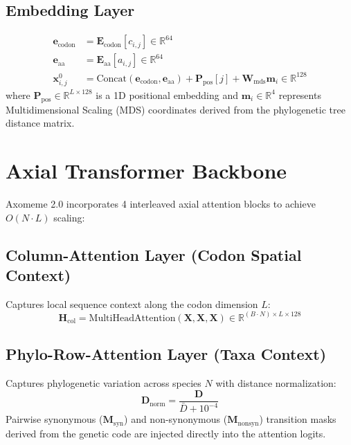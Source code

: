 \documentclass[11pt,a4paper]{article}
\begin{document}
\subsection{Embedding Layer}
\begin{align}
\mathbf{e}_{\text{codon}} &= \mathbf{E}_{\text{codon}}[c_{i,j}] \in \mathbb{R}^{64} \\
\mathbf{e}_{\text{aa}} &= \mathbf{E}_{\text{aa}}[a_{i,j}] \in \mathbb{R}^{64} \\
\mathbf{x}_{i,j}^0 &= \text{Concat}(\mathbf{e}_{\text{codon}}, \mathbf{e}_{\text{aa}}) + \mathbf{P}_{\text{pos}}[j] + \mathbf{W}_{\text{mds}} \mathbf{m}_i \in \mathbb{R}^{128}
\end{align}
where $\mathbf{P}_{\text{pos}} \in \mathbb{R}^{L \times 128}$ is a 1D positional embedding and $\mathbf{m}_i \in \mathbb{R}^4$ represents Multidimensional Scaling (MDS) coordinates derived from the phylogenetic tree distance matrix.

\section{Axial Transformer Backbone}

Axomeme 2.0 incorporates 4 interleaved axial attention blocks to achieve $O(N \cdot L)$ scaling:

\subsection{Column-Attention Layer (Codon Spatial Context)}
Captures local sequence context along the codon dimension $L$:
\begin{equation}
\mathbf{H}_{\text{col}} = \text{MultiHeadAttention}\left(\mathbf{X}, \mathbf{X}, \mathbf{X}\right) \in \mathbb{R}^{(B \cdot N) \times L \times 128}
\end{equation}

\subsection{Phylo-Row-Attention Layer (Taxa Context)}
Captures phylogenetic variation across species $N$ with distance normalization:
\begin{equation}
\mathbf{D}_{\text{norm}} = \frac{\mathbf{D}}{\bar{D} + 10^{-4}}
\end{equation}
Pairwise synonymous ($\mathbf{M}_{\text{syn}}$) and non-synonymous ($\mathbf{M}_{\text{nonsyn}}$) transition masks derived from the genetic code are injected directly into the attention logits.
\end{document}
